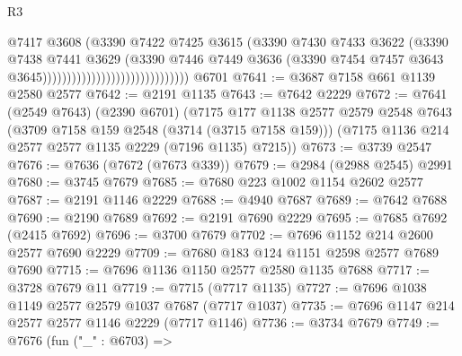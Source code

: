 \begin{lexlean}{R3}
\begin{coremodule}
                                                      @7417
                                                      @3608
                                                      (@3390
                                                        @7422
                                                        @7425
                                                        @3615
                                                        (@3390
                                                          @7430
                                                          @7433
                                                          @3622
                                                          (@3390
                                                            @7438
                                                            @7441
                                                            @3629
                                                            (@3390
                                                              @7446
                                                              @7449
                                                              @3636
                                                              (@3390
                                                                @7454
                                                                @7457
                                                                @3643
                                                                @3645))))))))))))))))))))))))))))))
    @6701
@7641 := @3687 @7158 @661 @1139 @2580 @2577
@7642 := @2191 @1135
@7643 := @7642 @2229
@7672 := @7641
    (@2549 @7643)
    (@2390 @6701)
    (@7175
      @177
      @1138
      @2577
      @2579
      @2548
      @7643
      (@3709 @7158 @159 @2548 (@3714 (@3715 @7158 @159)))
      (@7175 @1136 @214 @2577 @2577 @1135 @2229 (@7196 @1135) @7215))
@7673 := @3739 @2547
@7676 := @7636 (@7672 (@7673 @339))
@7679 := @2984 (@2988 @2545) @2991
@7680 := @3745 @7679
@7685 := @7680 @223 @1002 @1154 @2602 @2577
@7687 := @2191 @1146 @2229
@7688 := @4940 @7687
@7689 := @7642 @7688
@7690 := @2190 @7689
@7692 := @2191 @7690 @2229
@7695 := @7685 @7692 (@2415 @7692)
@7696 := @3700 @7679
@7702 := @7696 @1152 @214 @2600 @2577 @7690 @2229
@7709 := @7680 @183 @124 @1151 @2598 @2577 @7689 @7690
@7715 := @7696 @1136 @1150 @2577 @2580 @1135 @7688
@7717 := @3728 @7679 @11
@7719 := @7715 (@7717 @1135)
@7727 := @7696 @1038 @1149 @2577 @2579 @1037 @7687 (@7717 @1037)
@7735 := @7696 @1147 @214 @2577 @2577 @1146 @2229 (@7717 @1146)
@7736 := @3734 @7679
@7749 := @7676
    (fun ("_" : @6703) =>

\end{coremodule}
\end{lexlean}
